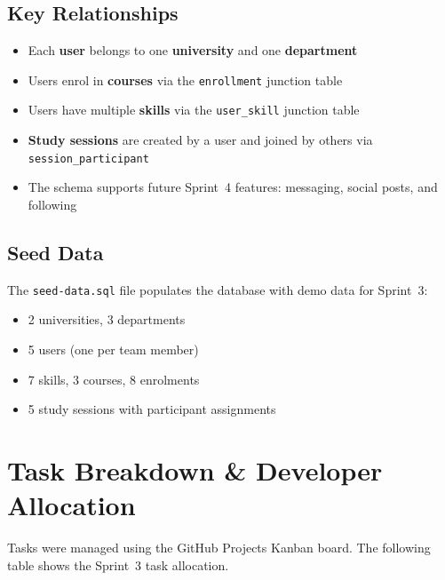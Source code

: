 \documentclass[11pt,a4paper]{article}
\begin{document}
\subsection{Key Relationships}

\begin{itemize}[nosep]
    \item Each \textbf{user} belongs to one \textbf{university} and one \textbf{department}
    \item Users enrol in \textbf{courses} via the \texttt{enrollment} junction table
    \item Users have multiple \textbf{skills} via the \texttt{user\_skill} junction table
    \item \textbf{Study sessions} are created by a user and joined by others via \texttt{session\_participant}
    \item The schema supports future Sprint~4 features: messaging, social posts, and following
\end{itemize}

\subsection{Seed Data}

The \texttt{seed-data.sql} file populates the database with demo data for Sprint~3:
\begin{itemize}[nosep]
    \item 2 universities, 3 departments
    \item 5 users (one per team member)
    \item 7 skills, 3 courses, 8 enrolments
    \item 5 study sessions with participant assignments
\end{itemize}

\newpage

\section{Task Breakdown \& Developer Allocation}

Tasks were managed using the GitHub Projects Kanban board. The following table shows the Sprint~3 task allocation.
\end{document}
